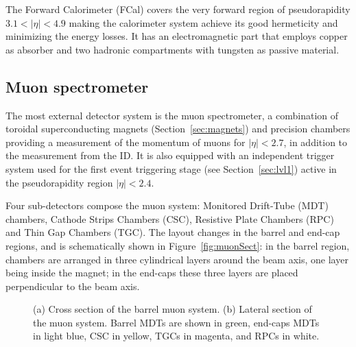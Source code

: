 The Forward Calorimeter (FCal) covers the very forward region of pseudorapidity
$3.1<|\eta|<4.9$ making the calorimeter system achieve its good hermeticity
and minimizing the energy losses.
It has an electromagnetic part that employs copper as absorber and two hadronic compartments
with tungsten as passive material. 




\subsection{Muon spectrometer}\label{sec:muonspec}

The most external detector system is the muon spectrometer, a combination
of toroidal superconducting magnets (Section~\ref{sec:magnets}) and precision
chambers providing a measurement of the momentum of muons for $|\eta|<2.7$, in addition
to the measurement from the ID. It is also equipped 
with an independent trigger system used for the first event triggering
stage (see Section~\ref{sec:lvl1}) active in the pseudorapidity region $|\eta|<2.4$. 

Four sub-detectors compose the muon system: Monitored Drift-Tube (MDT) chambers, 
Cathode Strips Chambers (CSC), Resistive Plate Chambers (RPC) and Thin Gap Chambers (TGC).
The layout changes in the barrel and end-cap regions, and is schematically shown in 
Figure~\ref{fig:muonSect}: in the  barrel region, chambers are arranged in three cylindrical layers around
the beam axis, one layer being inside the magnet; in the end-caps these three layers are placed 
perpendicular to the beam axis.

\begin{figure}[tb]\begin{center}
	\caption{(a) Cross section of the barrel muon system. (b) Lateral section of the muon system. 
        Barrel MDTs are shown in green, end-caps MDTs in light blue, CSC in yellow, 
        TGCs in magenta, and RPCs in white.%
        }
\end{center}\end{figure}


